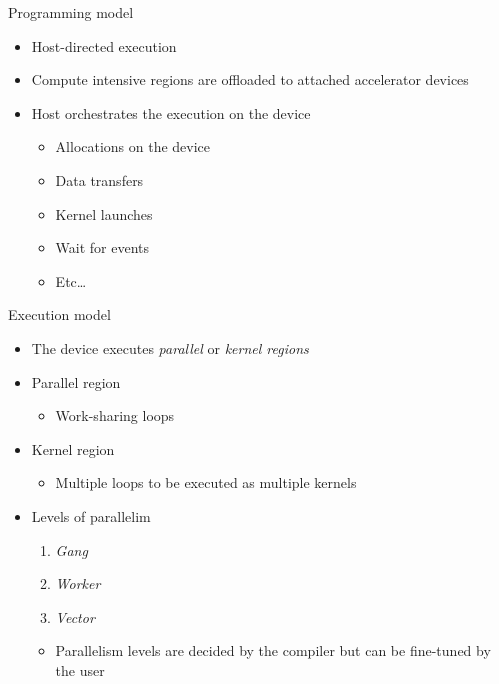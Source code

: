 \documentclass[12pt,aspectratio=169]{beamer}
\begin{document}
\begin{frame}{Programming model}
  \begin{itemize}
  \item Host-directed execution
  \item Compute intensive regions are offloaded to attached accelerator devices
  \item Host orchestrates the execution on the device
    \begin{itemize}
    \item Allocations on the device
    \item Data transfers
    \item Kernel launches
    \item Wait for events
    \item Etc\dots
    \end{itemize}
  \end{itemize}
\end{frame}

\begin{frame}{Execution model}
  \begin{itemize}
  \item The device executes \emph{parallel} or \emph{kernel regions}
  \item Parallel region
    \begin{itemize}
    \item Work-sharing loops
    \end{itemize}
  \item Kernel region
    \begin{itemize}
    \item Multiple loops to be executed as multiple kernels
    \end{itemize}
  \item Levels of parallelim
    \begin{enumerate}
    \item \emph{Gang} 
    \item \emph{Worker} 
    \item \emph{Vector} 
    \end{enumerate}
    \begin{itemize}
    \item Parallelism levels are decided by the compiler but can be fine-tuned by
      the user
    \end{itemize}
  \end{itemize}
\end{frame}
\end{document}
